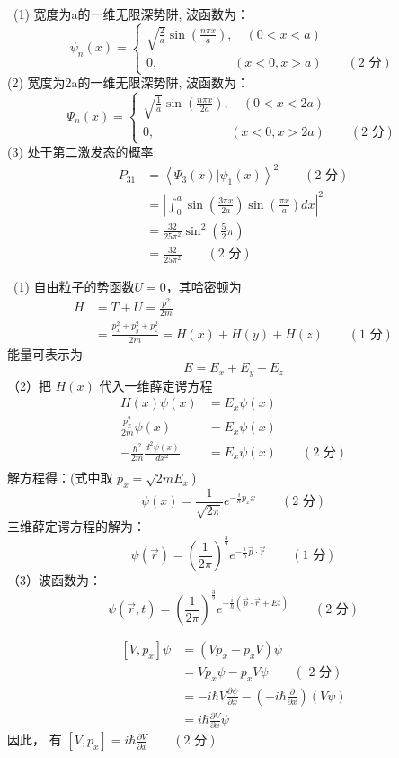 ~\\
\解~(1) 宽度为a的一维无限深势阱, 波函数为：
\[ \psi_n(x) = \begin{cases}
\sqrt{\frac{2}{a}} \sin (\frac{n\pi x}{a}), \quad (0<x<a) \\ 
0, \qquad \qquad \qquad (x<0, x>a)    \qquad   (\text{2 分})
\end{cases} \]
(2) 宽度为2a的一维无限深势阱, 波函数为：
\[ \Psi_n(x) = \begin{cases}
\sqrt{\frac{1}{a}} \sin (\frac{n\pi x}{2a}), \quad (0<x<2a) \\ 
0, \qquad \qquad \qquad (x<0, x>2a)  \qquad   (\text{2 分})
\end{cases} \]
(3) 处于第二激发态的概率:
\[ \begin{aligned}
    P_{31} &= \left\langle \Psi_3(x) | \psi_1(x) \right\rangle ^2  \qquad   (\text{2 分}) \\
    &= \left|\int _0 ^a \sin (\frac{3\pi x}{2a}) \sin (\frac{\pi x}{a}) dx \right|^2 \\
    &= \frac{32}{25\pi^2}\sin ^2 (\frac{5}{2}\pi) \\ 
    &= \frac{32}{25\pi^2}  \qquad   (\text{2 分}) 
\end{aligned}\] 

\解~(1) 自由粒子的势函数$U=0$，其哈密顿为
\[ \begin{aligned} H &= T+U = \frac{p^2}{2m} \\ 
    &=\frac{p_x^2 + p_y^2 + p_z^2 }{2m} = H(x) + H(y) 
    + H(z) \qquad (\text{1 分})
\end{aligned}\]
能量可表示为
\[ E = E_x +E_y +E_z  \]
（2）把 $H(x)$ 代入一维薛定谔方程
\[ \begin{aligned}
    H(x)\psi(x) &=E_x\psi(x) \\
    \frac{p_x^2}{2m}\psi(x) &= E_x\psi(x) \\
    - \frac{\hbar^2}{2m} \frac{d ^2 \psi(x)}{d x ^2 } &= E_x\psi(x) \qquad (\text{2 分}) \\
\end{aligned}\] 
解方程得：(式中取 $p_x = \sqrt{ 2m E_x}$)
\[ \psi(x) = \frac{1}{\sqrt{2\pi}}e^{-\frac{i}{\hbar}p_x x} \qquad (\text{2 分}) \]
三维薛定谔方程的解为：
\[ \psi(\vec{r}) =  (\frac{1}{2\pi})^\frac{3}{2} e^{-\frac{i}{\hbar}\vec{p}\cdot \vec{r}} \qquad (\text{1 分}) \]
（3）波函数为： 
\[ \psi(\vec{r},t) =  (\frac{1}{2\pi})^\frac{3}{2} e^{-\frac{i}{\hbar}(\vec{p}\cdot \vec{r}+Et)} \qquad (\text{2 分}) \]

\[ \begin{aligned}
    [V, p_x]\psi &= (Vp_x -p_x V)\psi \\
    &= Vp_x \psi -p_x V\psi  \qquad  (\text{ 2 分}) \\
    &= -i \hbar V \frac{\partial \psi}{\partial x } - (-i \hbar  \frac{\partial }{\partial x })(V\psi) \\ 
    &=  i\hbar\frac{\partial V }{\partial x }\psi
\end{aligned}\] 
因此， 有 $ [V, p_x] = i\hbar\frac{\partial V }{\partial x }  \qquad (\text{2 分})$